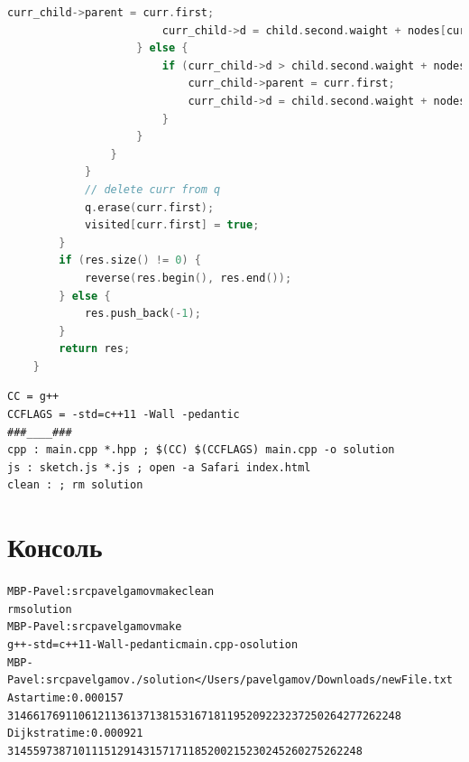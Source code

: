 \begin{lstlisting}[language=C++]
                        curr_child->parent = curr.first;
                        curr_child->d = child.second.waight + nodes[curr_child->parent].d;
                    } else {
                        if (curr_child->d > child.second.waight + nodes[curr.first].d) {
                            curr_child->parent = curr.first;
                            curr_child->d = child.second.waight + nodes[curr_child->parent].d;
                        }
                    }
                }
            }
            // delete curr from q
            q.erase(curr.first);
            visited[curr.first] = true;
        }
        if (res.size() != 0) {
            reverse(res.begin(), res.end());
        } else {
            res.push_back(-1);
        }
        return res;
    }
\end{lstlisting}

\lstset{language=[gnu] make}

\begin{lstlisting}
CC = g++
CCFLAGS = -std=c++11 -Wall -pedantic
###____###
cpp : main.cpp *.hpp ; $(CC) $(CCFLAGS) main.cpp -o solution
js : sketch.js *.js ; open -a Safari index.html
clean : ; rm solution
\end{lstlisting}

\pagebreak

\section{Консоль}

\begin{alltt}
MBP-Pavel:src pavelgamov make clean
rm solution
MBP-Pavel:src pavelgamov make
g++ -std=c++11 -Wall -pedantic main.cpp -o solution
MBP-Pavel:src pavelgamov ./solution < /Users/pavelgamov/Downloads/newFile.txt 
A star time: 0.000157		
31 46 61 76 91 106 121 136 137 138 153 167 181 195 209 223 237 250 264 277 262 248 
Dijkstra time : 0.000921		
31 45 59 73 87 101 115 129 143 157 171 185 200 215 230 245 260 275 262 248 
\end{alltt}

\pagebreak